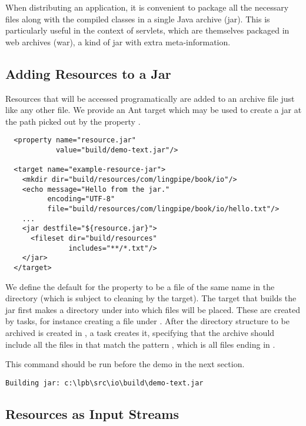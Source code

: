 When distributing an application, it is convenient to package all the
necessary files along with the compiled classes in a single Java
archive (jar).  This is particularly useful in the context of
servlets, which are themselves packaged in web archives (war), a kind
of jar with extra meta-information.

\subsection{Adding Resources to a Jar}

Resources that will be accessed programatically are added to an
archive file just like any other file.  We provide an Ant target
 which may be used to create a jar
at the path picked out by the property .  
%
\begin{verbatim}
  <property name="resource.jar"
            value="build/demo-text.jar"/>

  <target name="example-resource-jar">
    <mkdir dir="build/resources/com/lingpipe/book/io"/>
    <echo message="Hello from the jar."
          encoding="UTF-8"
          file="build/resources/com/lingpipe/book/io/hello.txt"/>
    ...
    <jar destfile="${resource.jar}">
      <fileset dir="build/resources" 
               includes="**/*.txt"/>
    </jar>
  </target>
\end{verbatim}
%
We define the default for the property  to be a
file of the same name in the  directory (which is subject
to cleaning by the  target).  The target that builds the
jar first makes a directory under  into which
files will be placed.  These are created by  tasks, for
instance creating a file  under
.  After the directory structure to be archived
is created in , a  task creates it,
specifying that the archive should include all the files in
 that match the pattern , which
is all files ending in .

This command should be run before the demo in the next section.
%
\begin{verbatim}
Building jar: c:\lpb\src\io\build\demo-text.jar
\end{verbatim}


\subsection{Resources as Input Streams}\label{section:io-resource-input}

